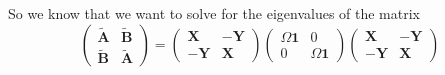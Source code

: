 So we know that we want to solve for the eigenvalues of the matrix
\begin{equation}
    \begin{pmatrix}
        \tilde{\bm{A}} & \tilde{\bm{B}} \\
        \tilde{\bm{B}} & \tilde{\bm{A}}
    \end{pmatrix}
=\begin{pmatrix}
    \bm{X} & -\bm{Y} \\
-\bm{Y} & \bm{X}
\end{pmatrix}
\begin{pmatrix}
    \Omega \mathbf{1} & 0 \\
0 & \Omega \mathbf{1}
\end{pmatrix}
\begin{pmatrix}
    \bm{X} & -\bm{Y} \\
-\bm{Y} & \bm{X}
\end{pmatrix}
\end{equation}
